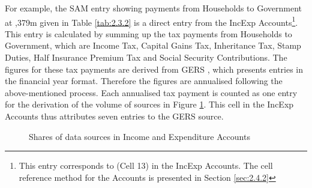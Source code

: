 \bigskip

For example, the SAM entry showing payments from Households to Government at ,379m given in Table \ref{tab:2.3.2} is a direct entry from the IncExp Accounts\footnote{This entry corresponds to (Cell 13) in the IncExp Accounts. The cell reference method for the Accounts is presented in Section \ref{sec:2.4.2}}. This entry is calculated by summing up the tax payments from Households to Government, which are Income Tax, Capital Gains Tax, Inheritance Tax, Stamp Duties, Half Insurance Premium Tax and Social Security Contributions. The figures for these tax payments are derived from GERS \cite{ScotGov2013b}, which presents entries in the financial year format. Therefore the figures are annualised following the above-mentioned process. Each annualised tax payment is counted as one entry for the derivation of the volume of sources in Figure \ref{fig:2.4.1}. This cell in the IncExp Accounts thus attributes seven entries to the GERS source\cite{ScotGov2013b}.\\

\bigskip

  \begin{figure}[H] \caption{Shares of data sources in Income and Expenditure Accounts}
  \begin{scriptsize} \begin{center}  \end{center} \end{scriptsize} \label{fig:2.4.1} \end{figure}

\bigskip

